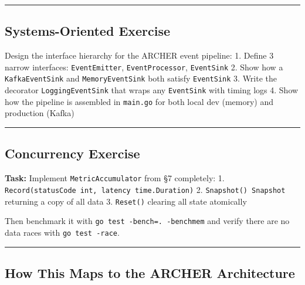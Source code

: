 \documentclass[
]{article}
\begin{document}
\begin{center}\rule{0.5\linewidth}{0.5pt}\end{center}

\hypertarget{systems-oriented-exercise-2}{%
\subsection{Systems-Oriented
Exercise}\label{systems-oriented-exercise-2}}

Design the interface hierarchy for the ARCHER event pipeline: 1. Define
3 narrow interfaces: \texttt{EventEmitter}, \texttt{EventProcessor},
\texttt{EventSink} 2. Show how a \texttt{KafkaEventSink} and
\texttt{MemoryEventSink} both satisfy \texttt{EventSink} 3. Write the
decorator \texttt{LoggingEventSink} that wraps any \texttt{EventSink}
with timing logs 4. Show how the pipeline is assembled in
\texttt{main.go} for both local dev (memory) and production (Kafka)

\begin{center}\rule{0.5\linewidth}{0.5pt}\end{center}

\hypertarget{concurrency-exercise}{%
\subsection{Concurrency Exercise}\label{concurrency-exercise}}

\textbf{Task:} Implement \texttt{MetricAccumulator} from §7 completely:
1. \texttt{Record(statusCode\ int,\ latency\ time.Duration)} 2.
\texttt{Snapshot()\ Snapshot} returning a copy of all data 3.
\texttt{Reset()} clearing all state atomically

Then benchmark it with \texttt{go\ test\ -bench=.\ -benchmem} and verify
there are no data races with \texttt{go\ test\ -race}.

\begin{center}\rule{0.5\linewidth}{0.5pt}\end{center}

\hypertarget{how-this-maps-to-the-archer-architecture-2}{%
\subsection{How This Maps to the ARCHER
Architecture}\label{how-this-maps-to-the-archer-architecture-2}}
\end{document}
